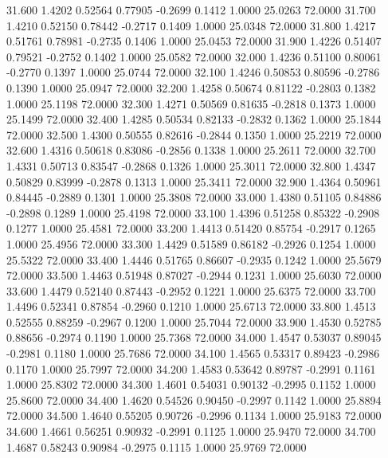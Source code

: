   31.600   1.4202   0.52564   0.77905  -0.2699   0.1412   1.0000  25.0263  72.0000
  31.700   1.4210   0.52150   0.78442  -0.2717   0.1409   1.0000  25.0348  72.0000
  31.800   1.4217   0.51761   0.78981  -0.2735   0.1406   1.0000  25.0453  72.0000
  31.900   1.4226   0.51407   0.79521  -0.2752   0.1402   1.0000  25.0582  72.0000
  32.000   1.4236   0.51100   0.80061  -0.2770   0.1397   1.0000  25.0744  72.0000
  32.100   1.4246   0.50853   0.80596  -0.2786   0.1390   1.0000  25.0947  72.0000
  32.200   1.4258   0.50674   0.81122  -0.2803   0.1382   1.0000  25.1198  72.0000
  32.300   1.4271   0.50569   0.81635  -0.2818   0.1373   1.0000  25.1499  72.0000
  32.400   1.4285   0.50534   0.82133  -0.2832   0.1362   1.0000  25.1844  72.0000
  32.500   1.4300   0.50555   0.82616  -0.2844   0.1350   1.0000  25.2219  72.0000
  32.600   1.4316   0.50618   0.83086  -0.2856   0.1338   1.0000  25.2611  72.0000
  32.700   1.4331   0.50713   0.83547  -0.2868   0.1326   1.0000  25.3011  72.0000
  32.800   1.4347   0.50829   0.83999  -0.2878   0.1313   1.0000  25.3411  72.0000
  32.900   1.4364   0.50961   0.84445  -0.2889   0.1301   1.0000  25.3808  72.0000
  33.000   1.4380   0.51105   0.84886  -0.2898   0.1289   1.0000  25.4198  72.0000
  33.100   1.4396   0.51258   0.85322  -0.2908   0.1277   1.0000  25.4581  72.0000
  33.200   1.4413   0.51420   0.85754  -0.2917   0.1265   1.0000  25.4956  72.0000
  33.300   1.4429   0.51589   0.86182  -0.2926   0.1254   1.0000  25.5322  72.0000
  33.400   1.4446   0.51765   0.86607  -0.2935   0.1242   1.0000  25.5679  72.0000
  33.500   1.4463   0.51948   0.87027  -0.2944   0.1231   1.0000  25.6030  72.0000
  33.600   1.4479   0.52140   0.87443  -0.2952   0.1221   1.0000  25.6375  72.0000
  33.700   1.4496   0.52341   0.87854  -0.2960   0.1210   1.0000  25.6713  72.0000
  33.800   1.4513   0.52555   0.88259  -0.2967   0.1200   1.0000  25.7044  72.0000
  33.900   1.4530   0.52785   0.88656  -0.2974   0.1190   1.0000  25.7368  72.0000
  34.000   1.4547   0.53037   0.89045  -0.2981   0.1180   1.0000  25.7686  72.0000
  34.100   1.4565   0.53317   0.89423  -0.2986   0.1170   1.0000  25.7997  72.0000
  34.200   1.4583   0.53642   0.89787  -0.2991   0.1161   1.0000  25.8302  72.0000
  34.300   1.4601   0.54031   0.90132  -0.2995   0.1152   1.0000  25.8600  72.0000
  34.400   1.4620   0.54526   0.90450  -0.2997   0.1142   1.0000  25.8894  72.0000
  34.500   1.4640   0.55205   0.90726  -0.2996   0.1134   1.0000  25.9183  72.0000
  34.600   1.4661   0.56251   0.90932  -0.2991   0.1125   1.0000  25.9470  72.0000
  34.700   1.4687   0.58243   0.90984  -0.2975   0.1115   1.0000  25.9769  72.0000
